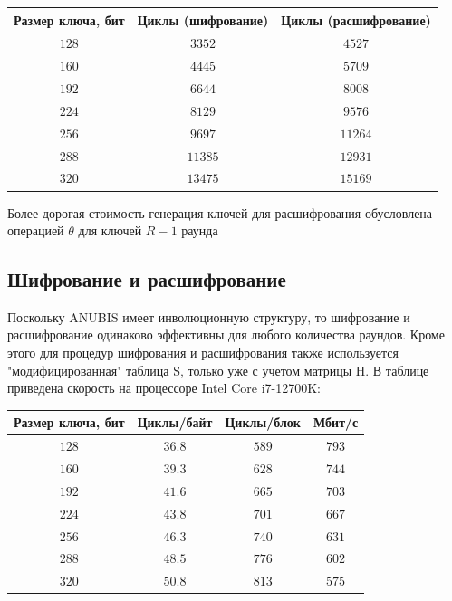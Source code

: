 \documentclass[12pt]{article}
\begin{document}
\begin{center}
\begin{tabular}{|c|c|c|}
    \hline
    Размер ключа, бит & Циклы (шифрование) & Циклы (расшифрование) \\
    \hline
    $128$ & $3352$ & $4527$ \\
    \hline
    $160$ & $4445$ & $5709$ \\
    \hline
    $192$ & $6644$ & $8008$ \\
    \hline
    $224$ & $8129$ & $9576$ \\
    \hline
    $256$ & $9697$ & $11264$ \\
    \hline
    $288$ & $11385$ & $12931$ \\
    \hline
    $320$ & $13475$ & $15169$ \\
    \hline
\end{tabular}
\end{center}

Более дорогая стоимость генерация ключей для расшифрования обусловлена операцией $\theta$ для ключей $R-1$ раунда

\subsection{Шифрование и расшифрование}
Поскольку ANUBIS имеет инволюционную структуру, то шифрование и расшифрование одинаково эффективны для любого количества раундов. Кроме этого для процедур шифрования и расшифрования также используется "модифицированная" таблица S, только уже с учетом матрицы H. В таблице приведена скорость на процессоре Intel Core i7-12700K:

\begin{center}
\begin{tabular}{|c|c|c|c|}
    \hline
    Размер ключа, бит & Циклы/байт & Циклы/блок & Мбит/с \\
    \hline
    $128$ & $36.8$ & $589$ & $793$ \\
    \hline
    $160$ & $39.3$ & $628$ & $744$ \\
    \hline
    $192$ & $41.6$ & $665$ & $703$ \\
    \hline
    $224$ & $43.8$ & $701$ & $667$ \\
    \hline
    $256$ & $46.3$ & $740$ & $631$ \\
    \hline
    $288$ & $48.5$ & $776$ & $602$ \\
    \hline
    $320$ & $50.8$ & $813$ & $575$ \\
    \hline
\end{tabular}
\end{center}
\end{document}
